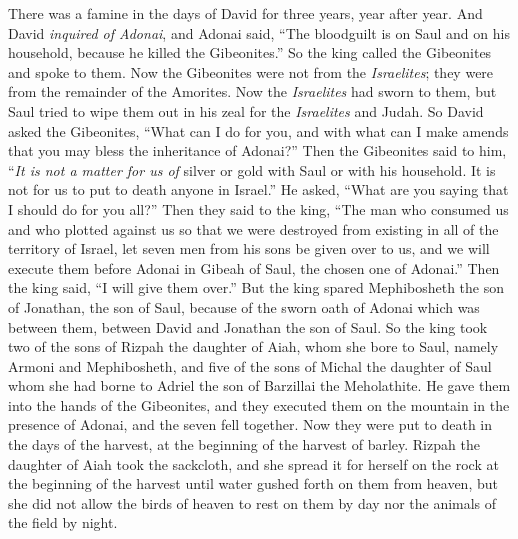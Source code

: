 \begin{biblechapter} %
 There was a famine in the days of David for three years, year after year. And David \textit{inquired of Adonai}, and Adonai said, “The bloodguilt is on Saul and on his household, because he killed the Gibeonites.”
\verse So the king called the Gibeonites and spoke to them. Now the Gibeonites were not from the \textit{Israelites}; they were from the remainder of the Amorites. Now the \textit{Israelites} had sworn to them, but Saul tried to wipe them out in his zeal for the \textit{Israelites} and Judah.
\verse So David asked the Gibeonites, “What can I do for you, and with what can I make amends that you may bless the inheritance of Adonai?”
\verse Then the Gibeonites said to him, “\textit{It is not a matter for us of} silver or gold with Saul or with his household. It is not for us to put to death anyone in Israel.” He asked, “What are you saying that I should do for you all?”
\verse Then they said to the king, “The man who consumed us and who plotted against us so that we were destroyed from existing in all of the territory of Israel,
\verse let seven men from his sons be given over to us, and we will execute them before Adonai in Gibeah of Saul, the chosen one of Adonai.” Then the king said, “I will give them over.”
\verse But the king spared Mephibosheth the son of Jonathan, the son of Saul, because of the sworn oath of Adonai which was between them, between David and Jonathan the son of Saul.
\verse So the king took two of the sons of Rizpah the daughter of Aiah, whom she bore to Saul, namely Armoni and Mephibosheth, and five of the sons of Michal the daughter of Saul whom she had borne to Adriel the son of Barzillai the Meholathite.
\verse He gave them into the hands of the Gibeonites, and they executed them on the mountain in the presence of Adonai, and the seven fell together. Now they were put to death in the days of the harvest, at the beginning of the harvest of barley.
\verse Rizpah the daughter of Aiah took the sackcloth, and she spread it for herself on the rock at the beginning of the harvest until water gushed forth on them from heaven, but she did not allow the birds of heaven to rest on them by day nor the animals of the field by night.

\end{biblechapter}
